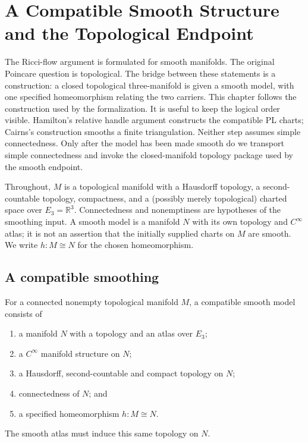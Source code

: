 \chapter{A Compatible Smooth Structure and the Topological Endpoint}
\label{ch:smoothing}

The Ricci-flow argument is formulated for smooth manifolds.  The original
Poincare question is topological.  The bridge between these statements is a
construction: a closed topological three-manifold is given a smooth model,
with one specified homeomorphism relating the two carriers.  This chapter
follows the construction used by the formalization.  It is useful to keep
the logical order visible.  Hamilton's relative handle argument constructs
the compatible PL charts; Cairns's construction smooths a finite
triangulation.  Neither step assumes simple connectedness.  Only after the
model has been made smooth do we transport simple connectedness and invoke
the closed-manifold topology package used by the smooth endpoint.

Throughout, $M$ is a topological manifold with a Hausdorff
topology, a second-countable topology, compactness, and a (possibly merely
topological) charted space over $E_3=\mathbb R^3$.  Connectedness and
nonemptiness are hypotheses of the smoothing input.  A smooth model is a
manifold $N$ with its own topology and $C^\infty$ atlas;
it is not an assertion that the initially supplied charts on $M$
are smooth.  We write $h:M\cong N$ for the chosen homeomorphism.

\section{A compatible smoothing}
\label{sec:smoothing-contract}

\begin{definition}
\label{def:smoothing-bridge}
For a connected nonempty topological manifold $M$, a compatible smooth
model consists of
\begin{enumerate}
\item a manifold $N$ with a topology and an atlas over $E_3$;
\item a $C^\infty$ manifold structure on $N$;
\item a Hausdorff, second-countable and compact topology on $N$;
\item connectedness of $N$; and
\item a specified homeomorphism $h:M\cong N$.
\end{enumerate}
The smooth atlas must induce this same topology on $N$.
\end{definition}

